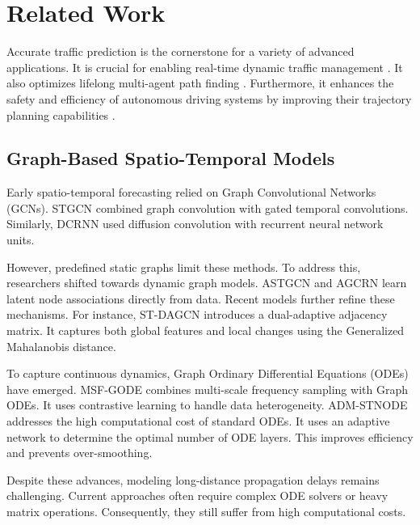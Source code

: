 \documentclass[5p,times,authoryear]{elsarticle}
\begin{document}
\section{Related Work}
Accurate traffic prediction is the cornerstone for a variety of advanced applications. It is crucial for enabling real-time dynamic traffic management \citep{khan2025smart,sun2024novel,guo2023connected}. It also optimizes lifelong multi-agent path finding \citep{chen2024traffic,zang2025online,zhang2025concurrent}. Furthermore, it enhances the safety and efficiency of autonomous driving systems by improving their trajectory planning capabilities \citep{yang2024multi,hu2022vehicle}.


\subsection{Graph-Based Spatio-Temporal Models}
Early spatio-temporal forecasting relied on Graph Convolutional Networks (GCNs). STGCN\citep{yu2018spatio} combined graph convolution with gated temporal convolutions. Similarly, DCRNN\citep{li2018dcrnn} used diffusion convolution with recurrent neural network units.

However, predefined static graphs limit these methods. To address this, researchers shifted towards dynamic graph models. ASTGCN\citep{guo2019attention} and AGCRN\citep{bai2020adaptive} learn latent node associations directly from data. Recent models further refine these mechanisms. For instance, ST-DAGCN\citep{liu2024st} introduces a dual-adaptive adjacency matrix. It captures both global features and local changes using the Generalized Mahalanobis distance.

To capture continuous dynamics, Graph Ordinary Differential Equations (ODEs) have emerged. MSF-GODE\citep{liu2025msf} combines multi-scale frequency sampling with Graph ODEs. It uses contrastive learning to handle data heterogeneity. ADM-STNODE\citep{chu2024adaptive} addresses the high computational cost of standard ODEs. It uses an adaptive network to determine the optimal number of ODE layers. This improves efficiency and prevents over-smoothing.

Despite these advances, modeling long-distance propagation delays remains challenging. Current approaches often require complex ODE solvers or heavy matrix operations. Consequently, they still suffer from high computational costs.
\end{document}
